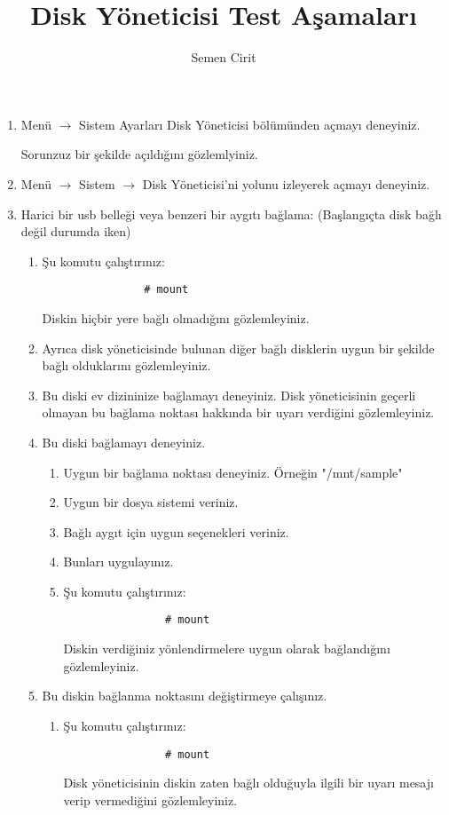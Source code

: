 \documentclass[a4paper,10pt]{article}
\title{Disk Yöneticisi Test Aşamaları}
\author{Semen Cirit}
\begin{document}
\maketitle
\begin{enumerate}

\item Menü $\rightarrow$ Sistem Ayarları Disk Yöneticisi bölümünden açmayı deneyiniz.

Sorunzuz bir şekilde açıldığını gözlemlyiniz.
\item Menü $\rightarrow$ Sistem $\rightarrow$ Disk Yöneticisi'ni yolunu izleyerek açmayı deneyiniz.

\item Harici bir usb belleği veya benzeri bir aygıtı bağlama: (Başlangıçta disk bağlı değil durumda iken) 
    \begin{enumerate}
        \item Şu komutu çalıştırınız:
            \begin{verbatim}
                # mount
            \end{verbatim}
            Diskin hiçbir yere bağlı olmadığını gözlemleyiniz. 

	\item Ayrıca disk yöneticisinde bulunan diğer bağlı disklerin uygun bir şekilde bağlı olduklarını gözlemleyiniz.

    \item Bu diski ev dizininize bağlamayı deneyiniz.
          Disk yöneticisinin geçerli olmayan bu bağlama noktası hakkında bir uyarı verdiğini gözlemleyiniz.
    \item Bu diski bağlamayı deneyiniz.
        \begin{enumerate}
            \item Uygun bir bağlama noktası deneyiniz. Örneğin "/mnt/sample"
            \item Uygun bir dosya sistemi veriniz.
            \item Bağlı aygıt için uygun seçenekleri veriniz.
            \item Bunları uygulayınız.
            \item Şu komutu çalıştırınız:
            \begin{verbatim}
                # mount
            \end{verbatim}
                Diskin verdiğiniz yönlendirmelere uygun olarak bağlandığını gözlemleyiniz.
        \end{enumerate}

    \item Bu diskin bağlanma noktasını değiştirmeye çalışınız.
        \begin{enumerate}
            \item Şu komutu çalıştırınız:
            \begin{verbatim}
                # mount
            \end{verbatim}
            Disk yöneticisinin diskin zaten bağlı olduğuyla ilgili bir uyarı mesajı verip vermediğini gözlemleyiniz.
        \end{enumerate}


\end{enumerate}
\end{enumerate}
\end{document}
